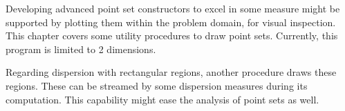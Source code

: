 %
Developing advanced point set constructors to excel in some measure might be supported by plotting them within the problem domain, for visual inspection. This chapter covers some utility procedures to draw point sets. Currently, this program is limited to 2 dimensions.

Regarding dispersion with rectangular regions, another procedure draws these regions. These can be streamed by some dispersion measures during its computation. This capability might ease the analysis of point sets as well.

\clearpage
